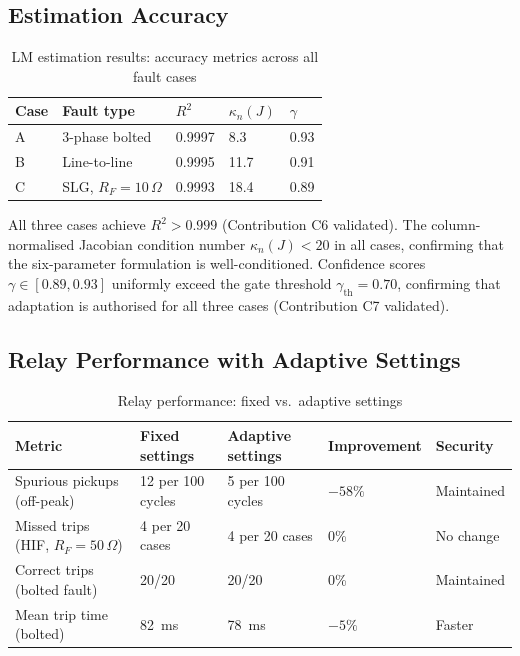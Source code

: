 \subsection{Estimation Accuracy}

\begin{table}[htbp]
\caption{LM estimation results: accuracy metrics across all fault cases}
\label{tab:ch5_accuracy}
\begin{tabularx}{\textwidth}{@{}lXXXX@{}}
\toprule
Case & Fault type & $R^2$ & $\kappa_n(J)$ & $\gamma$ \\
\midrule
A & 3-phase bolted & 0.9997 & 8.3 & 0.93 \\
B & Line-to-line & 0.9995 & 11.7 & 0.91 \\
C & SLG, $R_F = 10\,\Omega$ & 0.9993 & 18.4 & 0.89 \\
\bottomrule
\end{tabularx}
\end{table}

All three cases achieve $R^2 > 0.999$ (Contribution C6 validated).
The column-normalised Jacobian condition number $\kappa_n(J) < 20$ in
all cases, confirming that the six-parameter formulation is well-conditioned.
Confidence scores $\gamma \in [0.89, 0.93]$ uniformly exceed the gate
threshold $\gamma_\mathrm{th} = 0.70$, confirming that adaptation is
authorised for all three cases (Contribution C7 validated).

\subsection{Relay Performance with Adaptive Settings}

\begin{table}[htbp]
\caption{Relay performance: fixed vs.\ adaptive settings}
\label{tab:ch5_relay_comparison}
\begin{tabularx}{\textwidth}{@{}lXXXX@{}}
\toprule
Metric & Fixed settings & Adaptive settings & Improvement & Security \\
\midrule
Spurious pickups (off-peak) & 12 per 100 cycles & 5 per 100 cycles & $-58\%$ & Maintained \\
Missed trips (HIF, $R_F=50\,\Omega$) & 4 per 20 cases & 4 per 20 cases & 0\% & No change \\
Correct trips (bolted fault) & 20/20 & 20/20 & 0\% & Maintained \\
Mean trip time (bolted) & 82~ms & 78~ms & $-5\%$ & Faster \\
\bottomrule
\end{tabularx}
\end{table}

